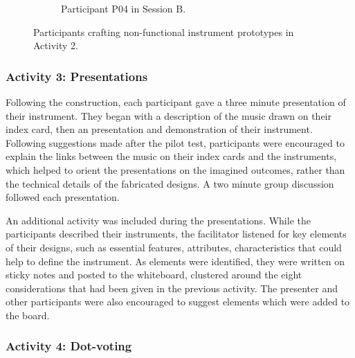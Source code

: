 \documentclass[letterpaper, 12pt]{article}
\begin{document}
\begin{figure}[htbp]
\begin{subfigure}[]{0.4\textwidth}
        \caption{Participant P04 in Session B.}
    \end{subfigure}
    \caption[Design for Performance workshop: Activity 2 - Non-functional prototyping]{Participants crafting non-functional instrument prototypes in Activity 2.}
    \label{ch3-fig:instrument-building}
\end{figure}


\subsubsection{Activity 3: Presentations}
\label{ch3-sec:activity-3-presentations}

Following the construction, each participant gave a three minute presentation of their instrument. They began with a description of the music drawn on their index card, then an presentation and demonstration of their instrument. Following suggestions made after the pilot test, participants were encouraged to explain the links between the music on their index cards and the instruments, which helped to orient the presentations on the imagined outcomes, rather than the technical details of the fabricated designs. A two minute group discussion followed each presentation. 

An additional activity was included during the presentations. While the participants described their instruments, the facilitator listened for key elements of their designs, such as essential features, attributes, characteristics that could help to define the instrument. As elements were identified, they were written on sticky notes and posted to the whiteboard, clustered around the eight considerations that had been given in the previous activity. The presenter and other participants were also encouraged to suggest elements which were added to the board. 

\subsubsection{Activity 4: Dot-voting}
\label{ch3-sec:activity-4-dot-voting}
\end{document}
